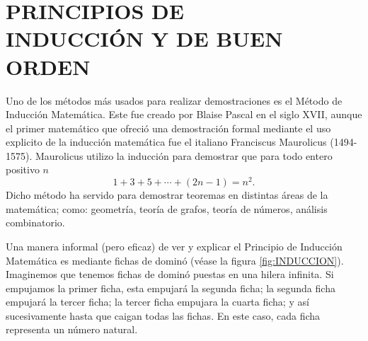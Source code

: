 \chapter[PRINCIPIOS DE INDUCCIÓN Y DE BUEN ORDEN]{PRINCIPIOS DE \\ INDUCCIÓN Y DE BUEN \\ ORDEN}\label{sec:induction}
\printchaptertableofcontents

Uno de los métodos más usados para realizar demostraciones es el Método de Inducción Matemática. Este fue creado por Blaise Pascal en el siglo XVII, aunque el primer matemático que ofreció una demostración formal mediante el uso explicito de la inducción matemática fue el italiano Franciscus Maurolicus (1494-1575). Maurolicus utilizo la inducción para demostrar que para todo entero positivo $n$
$$1 + 3 + 5 + \cdots + (2n-1) = n^2.$$
Dicho método ha servido para demostrar teoremas en distintas áreas de la matemática; como: geometría, teoría de grafos, teoría de números, análisis combinatorio.

Una manera informal (pero eficaz) de ver y explicar el Principio de Inducción Matemática es mediante fichas de dominó (véase la figura \ref{fig:INDUCCION}). Imaginemos que tenemos fichas de dominó puestas en una hilera infinita. Si empujamos la primer ficha, esta empujará la segunda ficha; la segunda ficha empujará la tercer ficha; la tercer ficha empujara la cuarta ficha; y así sucesivamente hasta que caigan todas las fichas. En este caso, cada ficha representa un número natural.

